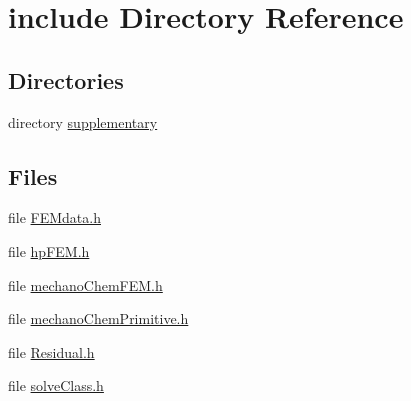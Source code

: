 \section{include Directory Reference}
\label{dir_578e1df620026135836ba5eebf8d4714}
\subsection*{Directories}
\begin{DoxyCompactItemize}
\item 
directory \hyperlink{dir_01fe4966f4c6f721b503d29c1479d673}{supplementary}
\end{DoxyCompactItemize}
\subsection*{Files}
\begin{DoxyCompactItemize}
\item 
file \hyperlink{_f_e_mdata_8h}{F\-E\-Mdata.\-h}
\item 
file \hyperlink{hp_f_e_m_8h}{hp\-F\-E\-M.\-h}
\item 
file \hyperlink{mechano_chem_f_e_m_8h}{mechano\-Chem\-F\-E\-M.\-h}
\item 
file \hyperlink{mechano_chem_primitive_8h}{mechano\-Chem\-Primitive.\-h}
\item 
file \hyperlink{_residual_8h}{Residual.\-h}
\item 
file \hyperlink{solve_class_8h}{solve\-Class.\-h}
\end{DoxyCompactItemize}
